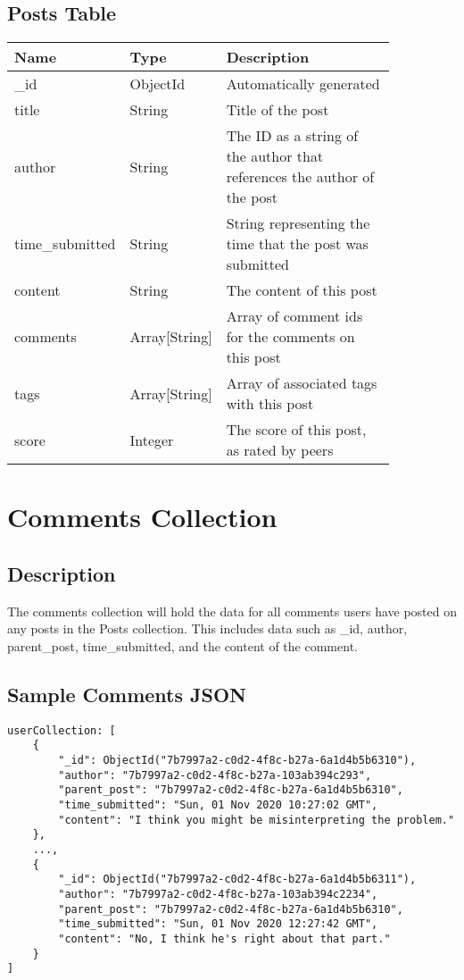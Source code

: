 \documentclass[preprint,11pt,3p]{article}
\begin{document}
\subsection{Posts Table}
\begingroup
\setlength{\tabcolsep}{15pt} %
\renewcommand{\arraystretch}{1.5} %
\begin{tabular}{| p{0.15\linewidth} | p{0.20\linewidth} | p{0.5\linewidth} |}
	\hline
	\textbf{Name} & \textbf{Type} & \textbf{Description} \\
	\hline
	_id & ObjectId & Automatically generated\\
	\hline
	title & String & Title of the post\\
	\hline
	author & String & The ID as a string of the author that references the author of the post\\
	\hline
	time_submitted & String & String representing the time that the post was submitted\\
	\hline
	content & String & The content of this post\\
	\hline
	comments & Array[String] & Array of comment ids for the comments on this post\\
	\hline
	tags & Array[String] & Array of associated tags with this post\\
	\hline
	score & Integer & The score of this post, as rated by peers\\
	\hline
\end{tabular}
\endgroup


\newpage

\section{Comments Collection}

\subsection{Description}
	The comments collection will hold the data for all comments users have posted on any posts in the Posts collection. This includes data such as _id, author, parent_post, time_submitted, and the content of the comment. 

\subsection{Sample Comments JSON}
\begin{lstlisting}
userCollection: [
	{
		"_id": ObjectId("7b7997a2-c0d2-4f8c-b27a-6a1d4b5b6310"),
		"author": "7b7997a2-c0d2-4f8c-b27a-103ab394c293",
		"parent_post": "7b7997a2-c0d2-4f8c-b27a-6a1d4b5b6310",
		"time_submitted": "Sun, 01 Nov 2020 10:27:02 GMT",
		"content": "I think you might be misinterpreting the problem."
	},
	...,
	{
		"_id": ObjectId("7b7997a2-c0d2-4f8c-b27a-6a1d4b5b6311"),
		"author": "7b7997a2-c0d2-4f8c-b27a-103ab394c2234",
		"parent_post": "7b7997a2-c0d2-4f8c-b27a-6a1d4b5b6310",
		"time_submitted": "Sun, 01 Nov 2020 12:27:42 GMT",
		"content": "No, I think he's right about that part."
	}
]
\end{lstlisting}
\end{document}

